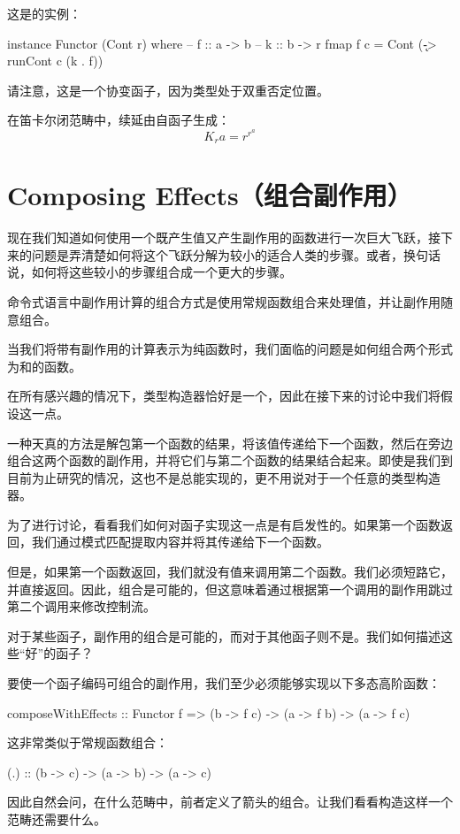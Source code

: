 \documentclass[DaoFP]{subfiles}
\begin{document}
    这是的实例：
    \begin{haskell}
        instance Functor (Cont r) where
        -- f :: a -> b
        -- k :: b -> r
        fmap f c = Cont (\k -> runCont c (k . f))
    \end{haskell}
    请注意，这是一个协变函子，因为类型处于双重否定位置。

    在笛卡尔闭范畴中，续延由自函子生成：
    \[ K_r a = r^{r^a} \]

    \section{Composing Effects（组合副作用）}

    现在我们知道如何使用一个既产生值又产生副作用的函数进行一次巨大飞跃，接下来的问题是弄清楚如何将这个飞跃分解为较小的适合人类的步骤。或者，换句话说，如何将这些较小的步骤组合成一个更大的步骤。

    命令式语言中副作用计算的组合方式是使用常规函数组合来处理值，并让副作用随意组合。

    当我们将带有副作用的计算表示为纯函数时，我们面临的问题是如何组合两个形式为和的函数。

    在所有感兴趣的情况下，类型构造器恰好是一个，因此在接下来的讨论中我们将假设这一点。

    一种天真的方法是解包第一个函数的结果，将该值传递给下一个函数，然后在旁边组合这两个函数的副作用，并将它们与第二个函数的结果结合起来。即使是我们到目前为止研究的情况，这也不是总能实现的，更不用说对于一个任意的类型构造器。

    为了进行讨论，看看我们如何对函子实现这一点是有启发性的。如果第一个函数返回，我们通过模式匹配提取内容并将其传递给下一个函数。

    但是，如果第一个函数返回，我们就没有值来调用第二个函数。我们必须短路它，并直接返回。因此，组合是可能的，但这意味着通过根据第一个调用的副作用跳过第二个调用来修改控制流。

    对于某些函子，副作用的组合是可能的，而对于其他函子则不是。我们如何描述这些“好”的函子？

    要使一个函子编码可组合的副作用，我们至少必须能够实现以下多态高阶函数：
    \begin{haskell}
        composeWithEffects :: Functor f =>
        (b -> f c) -> (a -> f b) -> (a -> f c)
    \end{haskell}
    这非常类似于常规函数组合：
    \begin{haskell}
    (.) :: (b -> c) -> (a -> b) -> (a -> c)
    \end{haskell}
    因此自然会问，在什么范畴中，前者定义了箭头的组合。让我们看看构造这样一个范畴还需要什么。
\end{document}

